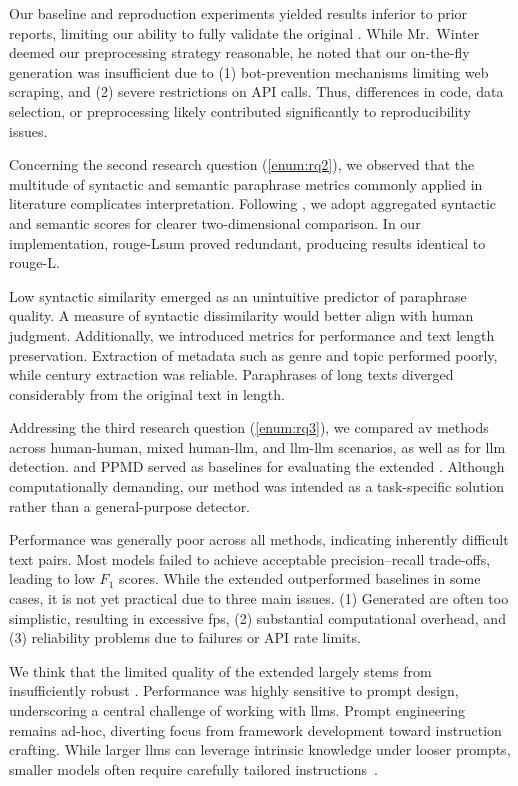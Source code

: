 Our baseline and reproduction experiments yielded results inferior to prior reports, limiting our ability to fully validate the original \impAppr{}. 
While Mr.~Winter deemed our preprocessing strategy reasonable, he noted that our on-the-fly \imp{} generation was insufficient due to (1) bot-prevention mechanisms limiting web scraping, and (2) severe restrictions on API calls. 
Thus, differences in code, data selection, or preprocessing likely contributed significantly to reproducibility issues.

Concerning the second research question (\autoref{enum:rq2}), we observed that the multitude of syntactic and semantic paraphrase metrics commonly applied in literature complicates interpretation. 
Following \citet{gohsen_captions_2023}, we adopt aggregated syntactic and semantic scores for clearer two-dimensional comparison. 
In our implementation, \ac{rouge}-Lsum proved redundant, producing results identical to \ac{rouge}-L.

Low syntactic similarity emerged as an unintuitive predictor of paraphrase quality.
A measure of syntactic dissimilarity would better align with human judgment. 
Additionally, we introduced metrics for \pextractor{} performance and text length preservation. 
Extraction of metadata such as genre and topic performed poorly, while century extraction was reliable. 
Paraphrases of long \dataGutenberg{} texts diverged considerably from the original text in length.

Addressing the third research question (\autoref{enum:rq3}), we compared \ac{av} methods across human-human, mixed human-\ac{llm}, and \ac{llm}-\ac{llm} scenarios, as well as for \ac{llm} detection. 
\unmasking{} and PPMD served as baselines for evaluating the extended \impAppr{}. 
Although computationally demanding, our method was intended as a task-specific solution rather than a general-purpose detector. 

Performance was generally poor across all methods, indicating inherently difficult text pairs. 
Most models failed to achieve acceptable precision–recall trade-offs, leading to low $F_1$ scores. 
While the extended \impAppr{} outperformed baselines in some cases, it is not yet practical due to three main issues. 
(1) Generated \imps{} are often too simplistic, resulting in excessive \acp{fp}, (2) substantial computational overhead, and (3) reliability problems due to \pgenerator{} failures or API rate limits.

We think that the limited quality of the extended \impAppr{} largely stems from insufficiently robust \imps{}. 
Performance was highly sensitive to prompt design, underscoring a central challenge of working with \acp{llm}. 
Prompt engineering remains ad-hoc, diverting focus from framework development toward instruction crafting. 
While larger \acp{llm} can leverage intrinsic knowledge under looser prompts, smaller models often require carefully tailored instructions~\citep{schmidt_llm_av_latin_24}. 

